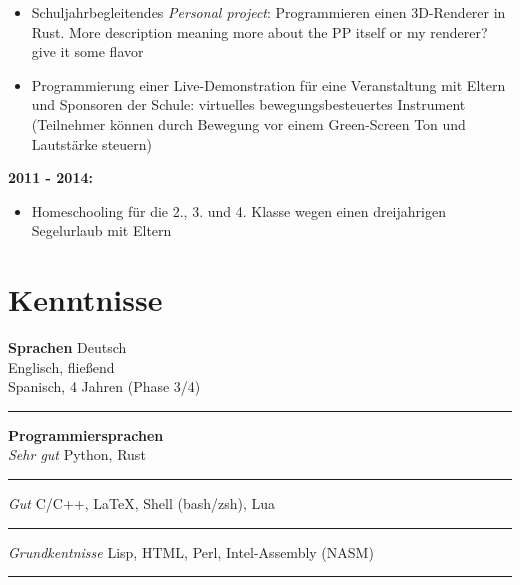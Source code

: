 \documentclass[12pt]{article}
\newcommand{\sect}[1]{\vspace{-12pt}\section*{#1}\vspace{-12pt}}
\newcommand{\sep}{{\color{gray}\vspace{-12pt}\hrule}}
\newcommand{\ask}[1]{{\color{red}#1}}
\begin{document}
{\begin{itemize}
  \item Schuljahrbegleitendes \textit{\glqq Personal project\grqq}:
    Programmieren einen 3D-Renderer in Rust. \ask{More description meaning more
      about the PP itself or my renderer?} \ask{give it some flavor}

  \item Programmierung einer Live-Demonstration f{\"u}r eine Veranstaltung mit
    Eltern und Sponsoren der Schule: virtuelles bewegungsbesteuertes Instrument
    (Teilnehmer k{\"o}nnen durch Bewegung vor einem Green-Screen Ton und
    Lautst{\"a}rke steuern)

  \end{itemize}

  \textbf{2011 - 2014:
  }
  \vspace{-10pt}
  \begin{itemize}
    \itemsep3pt
  \item Homeschooling f{\"u}r die 2., 3. und 4. Klasse wegen einen dreijahrigen Segelurlaub mit Eltern

  \end{itemize}


  \sect{Kenntnisse}
  \textbf{Sprachen} \hfill{Deutsch} \\
  \hspace*{\fill}Englisch, flie{\ss}end \\
  \hspace*{\fill}Spanisch, 4 Jahren (Phase 3/4) \\
  \sep

  \vspace{\parskip}

  \textbf{Programmiersprachen} \\
  \textit{Sehr gut} \hfill{Python, Rust} \\
  \sep
  \textit{Gut} \hfill{C/C++, \LaTeX, Shell (bash/zsh), Lua} \\
  \sep
  \textit{Grundkentnisse} \hfill{Lisp, HTML, Perl, Intel-Assembly (NASM)} \\
  \sep

}
\end{document}
